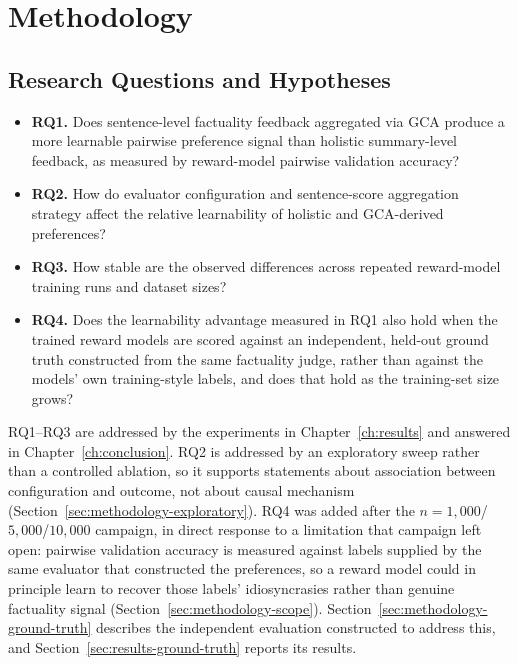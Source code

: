\chapter{Methodology}
\label{ch:methodology}

\section{Research Questions and Hypotheses}
\label{sec:methodology-rqs}

\begin{itemize}
  \item \textbf{RQ1.} Does sentence-level factuality feedback aggregated via GCA
    produce a more learnable pairwise preference signal than holistic
    summary-level feedback, as measured by reward-model pairwise validation
    accuracy?

  \item \textbf{RQ2.} How do evaluator configuration and sentence-score
    aggregation strategy affect the relative learnability of holistic and
    GCA-derived preferences?

  \item \textbf{RQ3.} How stable are the observed differences across repeated
    reward-model training runs and dataset sizes?

  \item \textbf{RQ4.} Does the learnability advantage measured in RQ1 also
    hold when the trained reward models are scored against an independent,
    held-out ground truth constructed from the same factuality judge, rather
    than against the models' own training-style labels, and does that hold as
    the training-set size grows?
\end{itemize}

RQ1--RQ3 are addressed by the experiments in Chapter~\ref{ch:results} and
answered in Chapter~\ref{ch:conclusion}. RQ2 is addressed by an exploratory
sweep rather than a controlled ablation, so it supports statements about
association between configuration and outcome, not about causal mechanism
(Section~\ref{sec:methodology-exploratory}). RQ4 was added after the
$n=1{,}000$/$5{,}000$/$10{,}000$ campaign, in direct response to a limitation
that campaign left open: pairwise validation accuracy is measured against
labels supplied by the same evaluator that constructed the preferences, so a
reward model could in principle learn to recover those labels' idiosyncrasies
rather than genuine factuality signal (Section~\ref{sec:methodology-scope}).
Section~\ref{sec:methodology-ground-truth} describes the independent
evaluation constructed to address this, and
Section~\ref{sec:results-ground-truth} reports its results.

